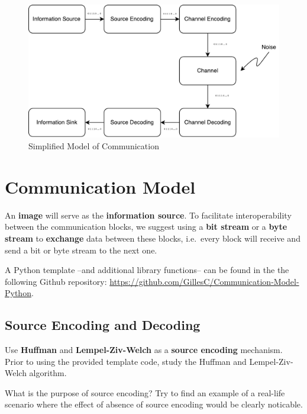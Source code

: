\documentclass[12pt,a4paper]{article}
\begin{document}
\begin{figure}[h]
	\centering
	\includegraphics[width=0.7\linewidth]{labo_1_multimedianetwerken_datatransmissie_diagram.pdf}
	\caption{Simplified Model of Communication}\label{fig:labo1multimedianetwerkendatatransmissiediagram}
\end{figure}


\section{Communication Model}
An \textbf{image} will serve as the \textbf{information source}. 
To facilitate interoperability between the communication blocks, we suggest using a \textbf{bit stream} or a \textbf{byte stream} to \textbf{exchange} data between these blocks, i.e.\ every block will receive and send a bit or byte stream to the next one. %

A Python template --and additional library functions-- can be found in the the following Github repository: \url{https://github.com/GillesC/Communication-Model-Python}. 

\subsection{Source Encoding and Decoding}
Use \textbf{Huffman} and \textbf{Lempel-Ziv-Welch} as a \textbf{source encoding} mechanism. Prior to using the provided template code, study the Huffman and Lempel-Ziv-Welch algorithm. 


\begin{question}
	What is the purpose of source encoding? Try to find an example of a real-life scenario where the effect of absence of source encoding would be clearly noticable.
\end{question}
\end{document}
